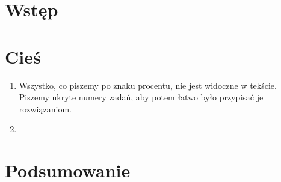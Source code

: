 \section{Wstęp}



\section{Cieś}
\begin{enumerate}

\item %
Wszystko, co piszemy po znaku procentu, nie jest widoczne w
tekście. Piszemy ukryte numery zadań, aby potem łatwo było
przypisać je rozwiązaniom.

\item %


\end{enumerate}


\section{Podsumowanie}
